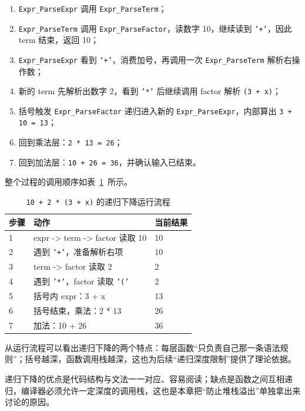 \begin{enumerate}
\item \texttt{Expr\_ParseExpr} 调用 \texttt{Expr\_ParseTerm}；
\item \texttt{Expr\_ParseTerm} 调用 \texttt{Expr\_ParseFactor}，读数字 10，继续读到 \texttt{'+'}，因此 term 结束，返回 10；
\item \texttt{Expr\_ParseExpr} 看到 \texttt{'+'}，消费加号，再调用一次 \texttt{Expr\_ParseTerm} 解析右操作数；
\item 新的 term 先解析出数字 2，看到 \texttt{'*'} 后继续调用 factor 解析 \texttt{(3 + x)}；
\item 括号触发 \texttt{Expr\_ParseFactor} 递归进入新的 \texttt{Expr\_ParseExpr}，内部算出 \texttt{3 + 10 = 13}；
\item 回到乘法层：\texttt{2 * 13 = 26}；
\item 回到加法层：\texttt{10 + 26 = 36}，并确认输入已结束。
\end{enumerate}

整个过程的调用顺序如表~\ref{tab:recursive-flow}~所示。

\begin{table}[htbp]
\centering \caption{\texttt{10 + 2 * (3 + x)} 的递归下降运行流程} \label{tab:recursive-flow}
    \begin{tabular}{lll}
        \toprule
        步骤 & 动作 & 当前结果 \\
        \midrule
        1 & expr -> term -> factor 读取 10 & 10 \\
        2 & 遇到 \texttt{'+'}，准备解析右项 & 10 \\
        3 & term -> factor 读取 2 & 2 \\
        4 & 遇到 \texttt{'*'}，factor 读取 \texttt{'('} & 2 \\
        5 & 括号内 expr：3 + x & 13 \\
        6 & 括号结束，乘法：2 * 13 & 26 \\
        7 & 加法：10 + 26 & 36 \\
        \bottomrule
    \end{tabular}
\end{table}

从运行流程可以看出递归下降的两个特点：每层函数“只负责自己那一条语法规则”；括号越深，函数调用栈越深，这也为后续“递归深度限制”提供了理论依据。

递归下降的优点是代码结构与文法一一对应、容易阅读；缺点是函数之间互相递归，编译器必须允许一定深度的调用栈，这也是本章把“防止堆栈溢出”单独拿出来讨论的原因。

